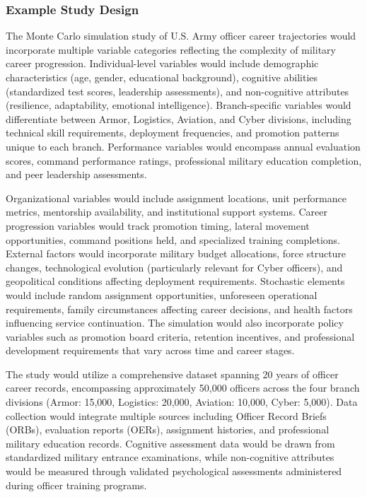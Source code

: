 \documentclass[main.tex]{subfiles}
\begin{document}
\subsubsection{Example Study Design}


The Monte Carlo simulation study of U.S. Army officer career trajectories would incorporate multiple variable categories reflecting the complexity of military career progression. Individual-level variables would include demographic characteristics (age, gender, educational background), cognitive abilities (standardized test scores, leadership assessments), and non-cognitive attributes (resilience, adaptability, emotional intelligence). Branch-specific variables would differentiate between Armor, Logistics, Aviation, and Cyber divisions, including technical skill requirements, deployment frequencies, and promotion patterns unique to each branch. Performance variables would encompass annual evaluation scores, command performance ratings, professional military education completion, and peer leadership assessments.

Organizational variables would include assignment locations, unit performance metrics, mentorship availability, and institutional support systems. Career progression variables would track promotion timing, lateral movement opportunities, command positions held, and specialized training completions. External factors would incorporate military budget allocations, force structure changes, technological evolution (particularly relevant for Cyber officers), and geopolitical conditions affecting deployment requirements. Stochastic elements would include random assignment opportunities, unforeseen operational requirements, family circumstances affecting career decisions, and health factors influencing service continuation. The simulation would also incorporate policy variables such as promotion board criteria, retention incentives, and professional development requirements that vary across time and career stages.


The study would utilize a comprehensive dataset spanning 20 years of officer career records, encompassing approximately 50,000 officers across the four branch divisions (Armor: 15,000, Logistics: 20,000, Aviation: 10,000, Cyber: 5,000). Data collection would integrate multiple sources including Officer Record Briefs (ORBs), evaluation reports (OERs), assignment histories, and professional military education records. Cognitive assessment data would be drawn from standardized military entrance examinations, while non-cognitive attributes would be measured through validated psychological assessments administered during officer training programs.
\end{document}
